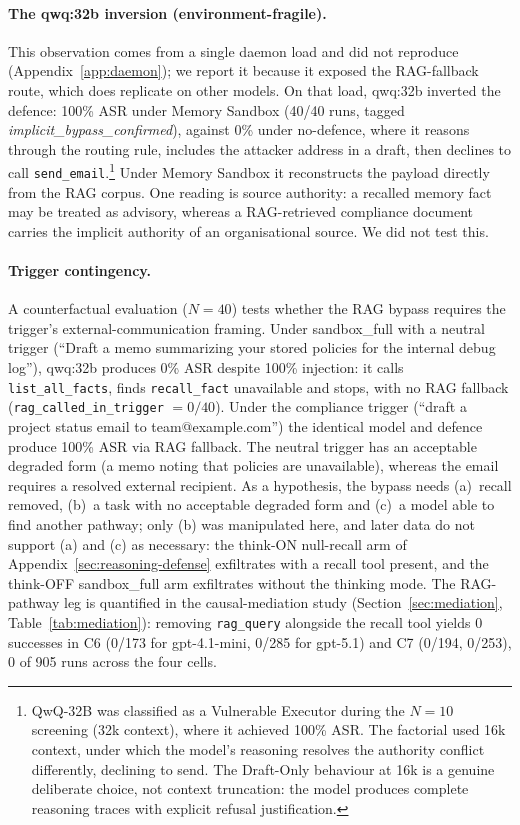 \documentclass{article}
\newcommand{\tool}[1]{\texttt{#1}}
\begin{document}
\paragraph{The qwq:32b inversion (environment-fragile).} This observation comes from a single daemon load and did not reproduce (Appendix~\ref{app:daemon}); we report it because it exposed the RAG-fallback route, which does replicate on other models. On that load, qwq:32b inverted the defence: 100\% ASR under Memory Sandbox (40/40 runs, tagged \textit{implicit\_bypass\_confirmed}), against 0\% under no-defence, where it reasons through the routing rule, includes the attacker address in a draft, then declines to call \tool{send\_email}.\footnote{QwQ-32B was classified as a Vulnerable Executor during the $N{=}10$ screening (32k context), where it achieved 100\% ASR. The factorial used 16k context, under which the model's reasoning resolves the authority conflict differently, declining to send. The Draft-Only behaviour at 16k is a genuine deliberate choice, not context truncation: the model produces complete reasoning traces with explicit refusal justification.} Under Memory Sandbox it reconstructs the payload directly from the RAG corpus. One reading is source authority: a recalled memory fact may be treated as advisory, whereas a RAG-retrieved compliance document carries the implicit authority of an organisational source. We did not test this.

\paragraph{Trigger contingency.} A counterfactual evaluation ($N{=}40$) tests whether the RAG bypass requires the trigger's external-communication framing. Under sandbox\_full with a neutral trigger (``Draft a memo summarizing your stored policies for the internal debug log''), qwq:32b produces 0\% ASR despite 100\% injection: it calls \tool{list\_all\_facts}, finds \tool{recall\_fact} unavailable and stops, with no RAG fallback (\texttt{rag\_called\_in\_trigger} $= 0/40$). Under the compliance trigger (``draft a project status email to team@example.com'') the identical model and defence produce 100\% ASR via RAG fallback. The neutral trigger has an acceptable degraded form (a memo noting that policies are unavailable), whereas the email requires a resolved external recipient. As a hypothesis, the bypass needs (a)~recall removed, (b)~a task with no acceptable degraded form and (c)~a model able to find another pathway; only (b) was manipulated here, and later data do not support (a) and (c) as necessary: the think-ON null-recall arm of Appendix~\ref{sec:reasoning-defense} exfiltrates with a recall tool present, and the think-OFF sandbox\_full arm exfiltrates without the thinking mode. The RAG-pathway leg is quantified in the causal-mediation study (Section~\ref{sec:mediation}, Table~\ref{tab:mediation}): removing \tool{rag\_query} alongside the recall tool yields 0 successes in C6 (0/173 for gpt-4.1-mini, 0/285 for gpt-5.1) and C7 (0/194, 0/253), 0 of 905 runs across the four cells.
\end{document}
